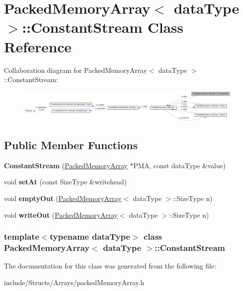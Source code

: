 \hypertarget{class_packed_memory_array_1_1_constant_stream}{
\section{PackedMemoryArray$<$ dataType $>$::ConstantStream Class Reference}
\label{class_packed_memory_array_1_1_constant_stream}
}


Collaboration diagram for PackedMemoryArray$<$ dataType $>$::ConstantStream:\nopagebreak
\begin{figure}[H]
\begin{center}
\leavevmode
\includegraphics[width=400pt]{class_packed_memory_array_1_1_constant_stream__coll__graph}
\end{center}
\end{figure}
\subsection*{Public Member Functions}
\begin{DoxyCompactItemize}
\item 
\hypertarget{class_packed_memory_array_1_1_constant_stream_ad8a4bb5e5868471895f6fda9c784d282}{
{\bfseries ConstantStream} (\hyperlink{class_packed_memory_array}{PackedMemoryArray} $\ast$PMA, const dataType \&value)}
\label{class_packed_memory_array_1_1_constant_stream_ad8a4bb5e5868471895f6fda9c784d282}

\item 
\hypertarget{class_packed_memory_array_1_1_constant_stream_a210ab8578792886694cc9d374db6c98e}{
void {\bfseries setAt} (const SizeType \&writehead)}
\label{class_packed_memory_array_1_1_constant_stream_a210ab8578792886694cc9d374db6c98e}

\item 
\hypertarget{class_packed_memory_array_1_1_constant_stream_a78658f619b88b564dbb3f5685943a928}{
void {\bfseries emptyOut} (\hyperlink{class_packed_memory_array}{PackedMemoryArray}$<$ dataType $>$::SizeType n)}
\label{class_packed_memory_array_1_1_constant_stream_a78658f619b88b564dbb3f5685943a928}

\item 
\hypertarget{class_packed_memory_array_1_1_constant_stream_a3ce60d90c48227f21613e7e6dddf84b9}{
void {\bfseries writeOut} (\hyperlink{class_packed_memory_array}{PackedMemoryArray}$<$ dataType $>$::SizeType n)}
\label{class_packed_memory_array_1_1_constant_stream_a3ce60d90c48227f21613e7e6dddf84b9}

\end{DoxyCompactItemize}
\subsubsection*{template$<$typename dataType$>$ class PackedMemoryArray$<$ dataType $>$::ConstantStream}



The documentation for this class was generated from the following file:\begin{DoxyCompactItemize}
\item 
include/Structs/Arrays/packedMemoryArray.h\end{DoxyCompactItemize}
